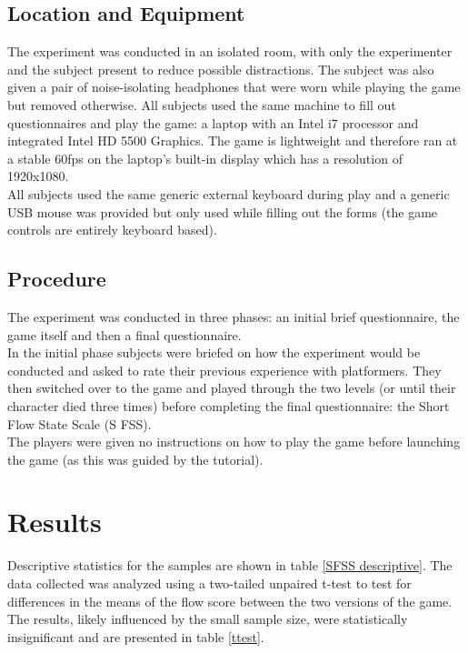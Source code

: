 \documentclass{acmsiggraph}
\begin{document}
\subsection{Location and Equipment}
The experiment was conducted in an isolated room, with only the experimenter and the subject present to reduce possible distractions.
The subject was also given a pair of noise-isolating headphones that were worn while playing the game but removed otherwise.
All subjects used the same machine to fill out questionnaires and play the game: a laptop with an Intel i7 processor and integrated Intel HD 5500 Graphics. The game is lightweight and therefore ran at a stable 60fps on the laptop's built-in display which has a resolution of 1920x1080.\\
All subjects used the same generic external keyboard during play and a generic USB mouse was provided but only used while filling out the forms (the game controls are entirely keyboard based).   

\subsection{Procedure}
The experiment was conducted in three phases: an initial brief questionnaire, the game itself and then a final questionnaire.\\
In the initial phase subjects were briefed on how the experiment would be conducted and asked to rate their previous experience with platformers. They then switched over to the game and played through the two levels (or until their character died three times) before completing the final questionnaire: the Short Flow State Scale (S FSS)\cite{jackson}.\\
The players were given no instructions on how to play the game before launching the game (as this was guided by the tutorial).



\section{Results}

Descriptive statistics for the samples are shown in table \ref{SFSS descriptive}. The data collected was analyzed using a two-tailed unpaired t-test to test for differences in the means of the flow score between the two versions of the game. The results, likely influenced by the small sample size, were statistically insignificant and are presented in table \ref{ttest}.
\end{document}
